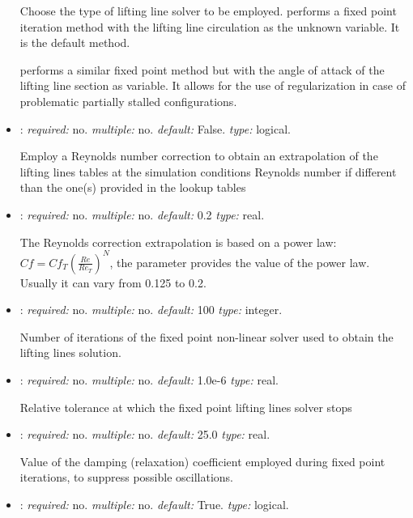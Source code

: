 \begin{itemize}
Choose the type of lifting line solver to be employed. 
 performs a fixed point iteration method with the lifting 
line circulation as the unknown variable. It is the default method. 

 performs a similar fixed point method but with the angle 
of attack of the lifting line section as variable. 
It allows for the use of regularization in case of problematic 
partially stalled configurations. 

\item {}: \textit{required:} no. 
\textit{multiple:} no. \textit{default:} False. \textit{type:} logical.

Employ a Reynolds number correction to obtain an extrapolation of 
the lifting lines tables at the simulation conditions Reynolds number 
if different than the one(s) provided in the lookup tables

\item {}: \textit{required:} no. 
\textit{multiple:} no. \textit{default:} 0.2 \textit{type:} real.

The Reynolds correction extrapolation is based on a power law: 
$Cf = Cf_T \left(\frac{Re}{Re_T}\right)^N$, the parameter provides the 
value of the power law. Usually it can vary from 0.125 to 0.2.

\item {}: \textit{required:} no. \textit{multiple:} no. 
\textit{default:} 100 \textit{type:} integer.

Number of iterations of the fixed point non-linear solver used to obtain 
the lifting lines solution.

\item {}: \textit{required:} no. \textit{multiple:} no. 
\textit{default:} 1.0e-6 \textit{type:} real.

Relative tolerance at which the fixed point lifting lines solver stops

\item {}: \textit{required:} no. \textit{multiple:} no. 
\textit{default:} 25.0 \textit{type:} real.

Value of the damping (relaxation) coefficient employed during fixed point 
iterations, to suppress possible oscillations.

\item {}: \textit{required:} no. 
\textit{multiple:} no. \textit{default:} True. \textit{type:} logical.


\end{itemize}
